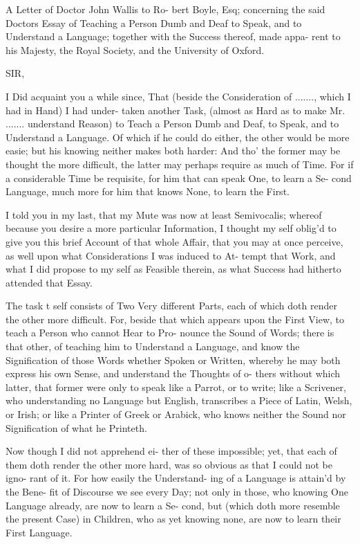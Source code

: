 A Letter of Doctor John Wallis to Ro-
bert Boyle, Esq; concerning the said
Doctors Essay of Teaching a Person
Dumb and Deaf to Speak, and to
Understand a Language; together
with the Success thereof, made appa-
rent to his Majesty, the Royal Society,
and the University of Oxford.

SIR,

I Did acquaint you a while since, That
(beside the Consideration of .......,
which I had in Hand) I had under-
taken another Task, (almost as Hard as
to make Mr. ....... understand Reason) to
Teach a Person Dumb and Deaf, to Speak,
and to Understand a Language. Of which if
he could do either, the other would be more
easie; but his knowing neither makes
both harder: And tho' the former may
be thought the more difficult, the latter
may perhaps require as much of Time.
For if a considerable Time be requisite,
for him that can speak One, to learn a Se-
cond Language, much more for him that
knows None, to learn the First.

I told you in my last, that my Mute was
now at least Semivocalis; whereof because
you desire a more particular Information,
I thought my self oblig'd to give you this
brief Account of that whole Affair, that
you may at once perceive, as well upon
what Considerations I was induced to At-
tempt that Work, and what I did propose
to my self as Feasible therein, as what
Success had hitherto attended that Essay.

The task t self consists of Two Very
different Parts, each of which doth render
the other more difficult. For, beside that
which appears upon the First View, to
teach a Person who cannot Hear to Pro-
nounce the Sound of Words; there is that
other, of teaching him to Understand a
Language, and know the Signification of
those Words whether Spoken or Written,
whereby he may both express his own
Sense, and understand the Thoughts of o-
thers without which latter, that former
were only to speak like a Parrot, or to
write; like a Scrivener, who understanding
no Language but English, transcribes a
Piece of Latin, Welsh, or Irish; or like a
Printer of Greek or Arabick, who knows
neither the Sound nor Signification of what
he Printeth.

Now though I did not apprehend ei-
ther of these impossible; yet, that each
of them doth render the other more hard,
was so obvious as that I could not be igno-
rant of it. For how easily the Understand-
ing of a Language is attain'd by the Bene-
fit of Discourse we see every Day; not
only in those, who knowing One
Language already, are now to learn a Se-
cond, but (which doth more resemble
the present Case) in Children, who as yet
knowing none, are now to learn their First
Language.

